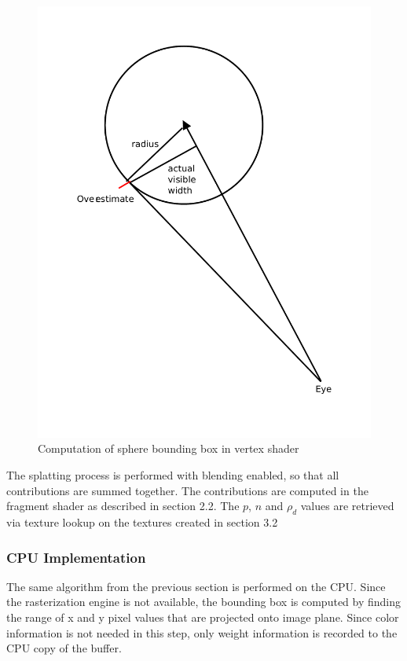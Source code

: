 \documentclass[10pt,twopage]{acmsiggraph}
\begin{document}
\begin{figure}[htbp]
\begin{center}
\includegraphics[scale = .35]{splatEye.pdf}
\caption{Computation of sphere bounding box in vertex shader}
\label{boundingBox}
\end{center}
\end{figure}

The splatting process is performed with blending enabled, so that all contributions are summed together.  The contributions are computed in the fragment shader as described in section 2.2.  The $p$, $n$ and $\rho_d$ values are retrieved via texture lookup on the textures created in section 3.2 

\subsubsection{CPU Implementation}
The same algorithm from the previous section is performed on the CPU.  Since the rasterization engine is not available, the bounding box is computed by finding the range of x and y pixel values that are projected onto image plane.  Since color information is not needed in this step, only weight information is recorded to the CPU copy of the buffer.
\end{document}
